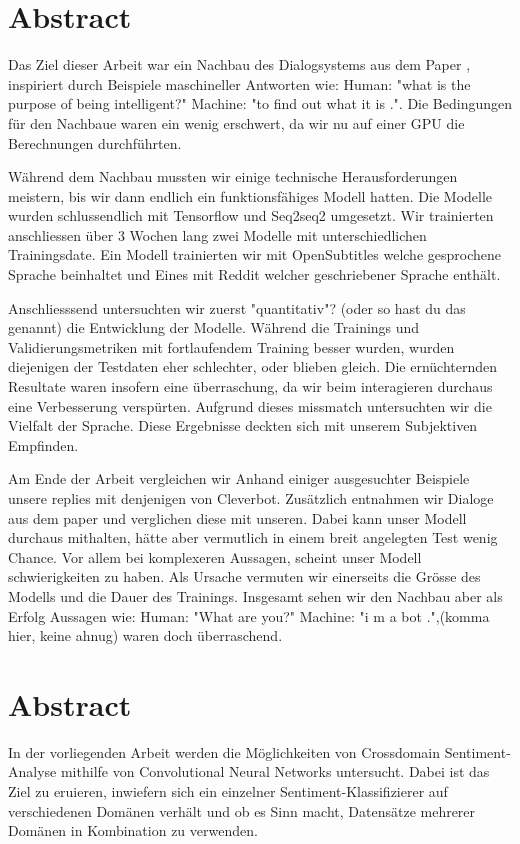 \chapter*{Abstract}
Das Ziel dieser Arbeit war ein Nachbau des Dialogsystems aus dem Paper \cite{}, inspiriert durch Beispiele maschineller Antworten wie: Human: "what is the purpose of being intelligent?" Machine: "to find out what it is .". Die Bedingungen für den Nachbaue waren ein wenig erschwert, da wir nu auf einer GPU die Berechnungen durchführten.

Während dem Nachbau mussten wir einige technische Herausforderungen meistern, bis wir dann endlich ein funktionsfähiges Modell hatten. Die Modelle wurden schlussendlich mit Tensorflow und Seq2seq2 umgesetzt. Wir trainierten anschliessen über 3 Wochen lang zwei Modelle mit unterschiedlichen Trainingsdate. Ein Modell trainierten wir mit OpenSubtitles welche gesprochene Sprache beinhaltet und Eines mit Reddit welcher geschriebener Sprache enthält. 

Anschliesssend untersuchten wir zuerst "quantitativ"? (oder so hast du das genannt) die Entwicklung der Modelle. Während die Trainings und Validierungsmetriken mit fortlaufendem Training besser wurden, wurden diejenigen der Testdaten eher schlechter, oder blieben gleich. Die ernüchternden Resultate waren insofern eine überraschung, da wir beim interagieren durchaus eine Verbesserung verspürten. Aufgrund dieses missmatch untersuchten wir die Vielfalt der Sprache. Diese Ergebnisse deckten sich mit unserem Subjektiven Empfinden.

Am Ende der Arbeit vergleichen wir Anhand einiger ausgesuchter Beispiele unsere replies mit denjenigen von Cleverbot. Zusätzlich entnahmen wir Dialoge aus dem paper \cites{} und verglichen diese mit unseren. Dabei kann unser Modell durchaus mithalten, hätte aber vermutlich in einem breit angelegten Test wenig Chance. Vor allem bei komplexeren Aussagen, scheint unser Modell schwierigkeiten zu haben. Als Ursache vermuten wir einerseits die Grösse des Modells und die Dauer des Trainings. Insgesamt sehen wir den Nachbau aber als Erfolg Aussagen wie: Human: "What are you?" Machine: "i m a bot .",(komma hier, keine ahnug) waren doch überraschend.



\chapter*{Abstract}
In der vorliegenden Arbeit werden die Möglichkeiten von Crossdomain Sentiment-Analyse mithilfe von Convolutional Neural Networks untersucht. Dabei ist das Ziel zu eruieren, inwiefern sich ein einzelner Sentiment-Klassifizierer auf verschiedenen Domänen verhält und ob es Sinn macht, Datensätze mehrerer Domänen in Kombination zu verwenden.

